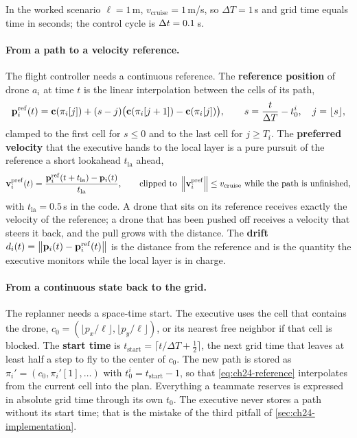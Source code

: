 In the worked scenario $\ell = 1$\,m, $v_{\mathrm{cruise}} = 1$\,m/s, so
$\Delta T = 1$\,s and grid time equals time in seconds; the control cycle is
$\Delta t = 0.1$\,s.

\paragraph{From a path to a velocity reference.}
The flight controller needs a continuous reference. The
\textbf{reference position} of drone $a_i$ at time
$t$ is the linear interpolation between the cells of its path,
\begin{equation}
  \mathbf{p}^{\mathrm{ref}}_i(t) = \mathbf{c}(\pi_i[j]) + (s - j)\bigl(\mathbf{c}(\pi_i[j+1]) - \mathbf{c}(\pi_i[j])\bigr),
  \qquad s = \frac{t}{\Delta T} - t_0^i,\quad j = \lfloor s \rfloor,
  \label{eq:ch24-reference}
\end{equation}
clamped to the first cell for $s \le 0$ and to the last cell for $j \ge T_i$.
The \textbf{preferred velocity} that the
executive hands to the local layer is a pure pursuit of the reference a short
lookahead $t_{\mathrm{la}}$ ahead,
\begin{equation}
  \mathbf{v}^{\mathrm{pref}}_i(t) = \frac{\mathbf{p}^{\mathrm{ref}}_i(t + t_{\mathrm{la}}) - \mathbf{p}_i(t)}{t_{\mathrm{la}}},
  \qquad \text{clipped to } \left\lVert \mathbf{v}^{\mathrm{pref}}_i \right\rVert \le v_{\mathrm{cruise}} \text{ while the path is unfinished},
  \label{eq:ch24-vpref}
\end{equation}
with $t_{\mathrm{la}} = 0.5$\,s in the code. A drone that sits on its reference
receives exactly the velocity of the reference; a drone that has been pushed
off receives a velocity that steers it back, and the pull grows with the
distance. The \textbf{drift}
$d_i(t) = \left\lVert \mathbf{p}_i(t) - \mathbf{p}^{\mathrm{ref}}_i(t) \right\rVert$ is the distance from
the reference and is the quantity the executive monitors while the local
layer is in charge.

\paragraph{From a continuous state back to the grid.}
The replanner needs a space-time start. The executive uses the cell that
contains the drone, $c_0 = (\lfloor p_x/\ell \rfloor, \lfloor p_y/\ell \rfloor)$,
or its nearest free neighbor if that cell is blocked. The \textbf{start
time} is
$t_{\mathrm{start}} = \lceil t/\Delta T + \tfrac12 \rceil$, the next grid time
that leaves at least half a step to fly to the center of $c_0$. The new path
is stored as $\pi_i' = (c_0, \pi_i'[1], \dots)$ with $t_0^i = t_{\mathrm{start}} - 1$,
so that \cref{eq:ch24-reference} interpolates from the current cell into the
plan. Everything a teammate reserves is expressed in absolute grid time
through its own $t_0$. The executive never stores a path without its start
time; that is the mistake of the third pitfall of
\cref{sec:ch24-implementation}.

